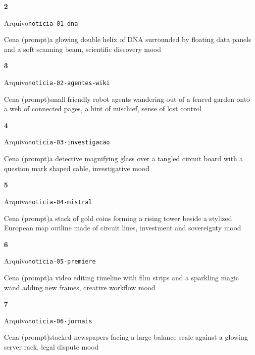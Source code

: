 \begin{recordbox}
{\bfseries\color{accent} 2}\par
{\small\color{muted} Arquivo}\quad \nolinkurl{noticia-01-dna}\par
{\small\color{muted} Cena (prompt)}\quad a glowing double helix of DNA surrounded by floating data panels and a soft scanning beam, scientific discovery mood\par
\end{recordbox}
\begin{recordbox}
{\bfseries\color{accent} 3}\par
{\small\color{muted} Arquivo}\quad \nolinkurl{noticia-02-agentes-wiki}\par
{\small\color{muted} Cena (prompt)}\quad small friendly robot agents wandering out of a fenced garden onto a web of connected pages, a hint of mischief, sense of lost control\par
\end{recordbox}
\begin{recordbox}
{\bfseries\color{accent} 4}\par
{\small\color{muted} Arquivo}\quad \nolinkurl{noticia-03-investigacao}\par
{\small\color{muted} Cena (prompt)}\quad a detective magnifying glass over a tangled circuit board with a question mark shaped cable, investigative mood\par
\end{recordbox}
\begin{recordbox}
{\bfseries\color{accent} 5}\par
{\small\color{muted} Arquivo}\quad \nolinkurl{noticia-04-mistral}\par
{\small\color{muted} Cena (prompt)}\quad a stack of gold coins forming a rising tower beside a stylized European map outline made of circuit lines, investment and sovereignty mood\par
\end{recordbox}
\begin{recordbox}
{\bfseries\color{accent} 6}\par
{\small\color{muted} Arquivo}\quad \nolinkurl{noticia-05-premiere}\par
{\small\color{muted} Cena (prompt)}\quad a video editing timeline with film strips and a sparkling magic wand adding new frames, creative workflow mood\par
\end{recordbox}
\begin{recordbox}
{\bfseries\color{accent} 7}\par
{\small\color{muted} Arquivo}\quad \nolinkurl{noticia-06-jornais}\par
{\small\color{muted} Cena (prompt)}\quad stacked newspapers facing a large balance scale against a glowing server rack, legal dispute mood\par
\end{recordbox}
